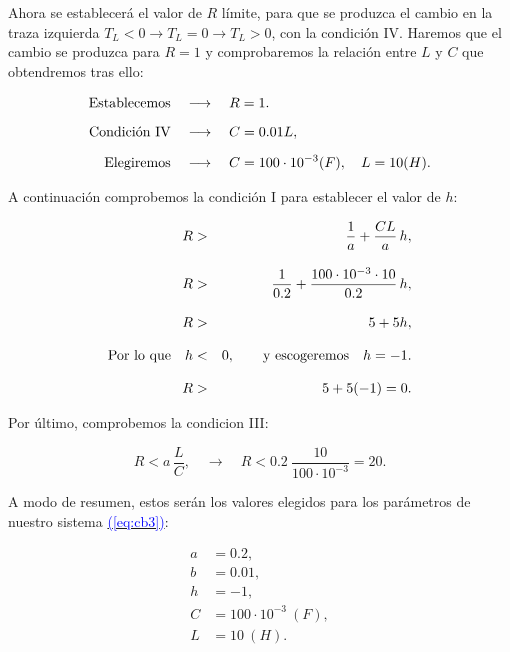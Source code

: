 \documentclass[12pt,a4paper]{report} %
\newcommand{\eref}[1]{\hyperref[#1]{\textcolor{blue}{(\ref*{#1})}}}
\begin{document}
	\vspace{0.5cm}\noindent Ahora se establecerá el valor de $R$ límite, para que se produzca el cambio en la traza izquierda $T_L<0 \rightarrow T_L=0 \rightarrow T_L>0$, con la condición IV. Haremos que el cambio se produzca para $R=1$ y comprobaremos la relación entre $L$ y $C$ que obtendremos tras ello:
	
	\begin{subequations}
		\label{eq:condd}
		\begin{align}
			\text{Establecemos} \quad &\longrightarrow \quad R=1. \label{eq:condr}\\[2mm]
			\text{Condición IV} \quad &\longrightarrow \quad C=0.01L,\notag\\[2mm]
			\text{Elegiremos} \quad &\longrightarrow \quad C=100\cdot10^{-3}(F), \quad L=10(H). \label{eq:condlc}
		\end{align}
	\end{subequations}\smallskip
	
	\vspace{0.5cm}\noindent A continuación comprobemos la condición I para establecer el valor de $h$:

	\begin{eqnarray}
		R&>&\frac{1}{a}+\frac{CL}{a}\, h,\notag\\[3mm]
		R&>&\frac{1}{0.2}+\frac{100\cdot10^{-3}\cdot10}{0.2}\, h, \notag\\[3mm]
		R&>&5+5h, \notag\\[3mm]
		\text{Por lo que}\quad h&<&0, \qquad \text{y escogeremos}\quad h=-1.\label{eq:condh}\\[3mm]
		R&>&5+5(-1)=0. \notag
	\end{eqnarray}\smallskip

	\vspace{0.5cm}\noindent Por último, comprobemos la condicion III:
	
	\begin{equation}
		\label{eq:condr20}
		R<a \, \frac{L}{C}, \quad \longrightarrow \quad R<0.2\:\frac{10}{100\cdot10^{-3}}=20.
	\end{equation}
	
	\newpage
	
	A modo de resumen, estos serán los valores elegidos para los parámetros de nuestro sistema \eref{eq:cb3}:
	
	\begin{equation}
		\label{eq:condiciones}
		\begin{aligned}
			a&=0.2, \\[2mm]
			b&=0.01, \\[2mm]
			h&=-1, \\[2mm]
			C&=100\cdot10^{-3}\:(F), \\[2mm]
			L&=10\:(H).
		\end{aligned}
	\end{equation}
	
\end{document}
